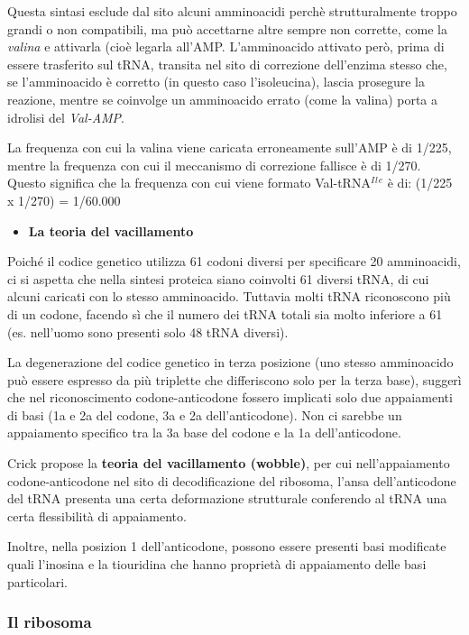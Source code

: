 \documentclass[]{article}
\begin{document}
Questa sintasi esclude dal sito alcuni amminoacidi perchè
strutturalmente troppo grandi o non compatibili, ma può accettarne altre
sempre non corrette, come la \emph{valina} e attivarla (cioè legarla
all'AMP. L'amminoacido attivato però, prima di essere trasferito sul
tRNA, transita nel sito di correzione dell'enzima stesso che, se
l'amminoacido è corretto (in questo caso l'isoleucina), lascia prosegure
la reazione, mentre se coinvolge un amminoacido errato (come la valina)
porta a idrolisi del \emph{Val-AMP}.

La frequenza con cui la valina viene caricata erroneamente sull'AMP è di
1/225, mentre la frequenza con cui il meccanismo di correzione fallisce
è di 1/270. Questo significa che la frequenza con cui viene formato
Val-tRNA\(^I\)\(^l\)\(^e\) è di: (1/225 x 1/270) = 1/60.000

\begin{itemize}
\itemsep1pt\parskip0pt
\item
  \textbf{La teoria del vacillamento}
\end{itemize}

Poiché il codice genetico utilizza 61 codoni diversi per specificare 20
amminoacidi, ci si aspetta che nella sintesi proteica siano coinvolti 61
diversi tRNA, di cui alcuni caricati con lo stesso amminoacido. Tuttavia
molti tRNA riconoscono più di un codone, facendo sì che il numero dei
tRNA totali sia molto inferiore a 61 (es. nell'uomo sono presenti solo
48 tRNA diversi).

La degenerazione del codice genetico in terza posizione (uno stesso
amminoacido può essere espresso da più triplette che differiscono solo
per la terza base), suggerì che nel riconoscimento codone-anticodone
fossero implicati solo due appaiamenti di basi (1a e 2a del codone, 3a e
2a dell'anticodone). Non ci sarebbe un appaiamento specifico tra la 3a
base del codone e la 1a dell'anticodone.

Crick propose la \textbf{teoria del vacillamento (wobble)}, per cui
nell'appaiamento codone-anticodone nel sito di decodificazione del
ribosoma, l'ansa dell'anticodone del tRNA presenta una certa
deformazione strutturale conferendo al tRNA una certa flessibilità di
appaiamento.

Inoltre, nella posizion 1 dell'anticodone, possono essere presenti basi
modificate quali l'inosina e la tiouridina che hanno proprietà di
appaiamento delle basi particolari.

\subsubsection{Il ribosoma}\label{il-ribosoma}
\end{document}
